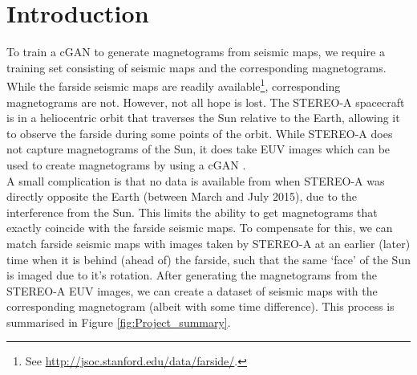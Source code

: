 \documentclass[11pt,a4paper,onecolumn]{report}
\begin{document}
\chapter{Introduction}




%
%

To train a cGAN to generate magnetograms from seismic maps, we require
a training set consisting of seismic maps and the corresponding magnetograms.
While the farside seismic maps are readily available\footnote{See
\url{http://jsoc.stanford.edu/data/farside/}.}, corresponding magnetograms are
not. However, not all hope is lost. The STEREO-A spacecraft is in a heliocentric
orbit that traverses the Sun relative to the Earth, allowing it to observe the
farside during some points of the orbit. While STEREO-A does not capture
magnetograms of the Sun, it does take EUV images which can be used to create
magnetograms by using a cGAN \citep{Kim2019}.\\

A small complication is that no data is available from when STEREO-A was
directly opposite the Earth (between March and July 2015), due to the
interference from the Sun. This limits the ability to get magnetograms that
exactly coincide with the farside seismic maps. To compensate for this, we can
match farside seismic maps with images taken by STEREO-A at an earlier (later)
time when it is behind (ahead of) the farside, such that the same `face' of the
Sun is imaged due to it's rotation. After generating the magnetograms from the
STEREO-A EUV images, we can create a dataset of seismic maps with the
corresponding magnetogram (albeit with some time difference). This process is
summarised in Figure \ref{fig:Project_summary}.\\
\end{document}
